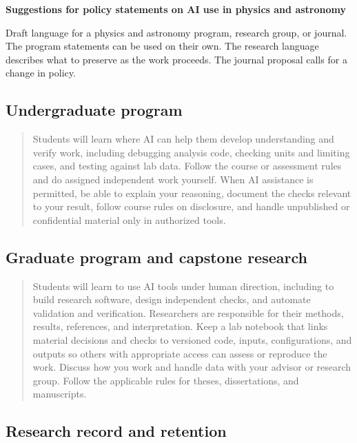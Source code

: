 \documentclass[11pt]{article}
\begin{document}
{\LARGE\bfseries Suggestions for policy statements on AI use in physics and astronomy\par}
\vspace{0.5em}
Draft language for a physics and astronomy program, research group, or
journal. The program statements can be used on their own. The research
language describes what to preserve as the work proceeds. The journal
proposal calls for a change in policy.

\subsection{Undergraduate program}\label{undergraduate-program}

\begin{quote}
Students will learn where AI can help them develop understanding and
verify work, including debugging analysis code, checking units and
limiting cases, and testing against lab data. Follow the course or
assessment rules and do assigned independent work yourself. When AI
assistance is permitted, be able to explain your reasoning, document the
checks relevant to your result, follow course rules on disclosure, and
handle unpublished or confidential material only in authorized tools.
\end{quote}

\subsection{Graduate program and capstone
research}\label{graduate-program-and-capstone-research}

\begin{quote}
Students will learn to use AI tools under human direction, including to
build research software, design independent checks, and automate
validation and verification. Researchers are responsible for their
methods, results, references, and interpretation. Keep a lab notebook
that links material decisions and checks to versioned code, inputs,
configurations, and outputs so others with appropriate access can assess
or reproduce the work. Discuss how you work and handle data with your
advisor or research group. Follow the applicable rules for theses,
dissertations, and manuscripts.
\end{quote}

\subsection{Research record and
retention}\label{research-record-and-retention}
\end{document}
